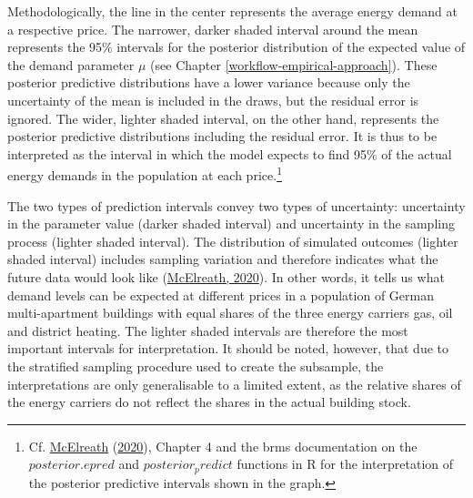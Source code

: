 \documentclass[12pt,twoside]{reedthesis}
\begin{document}
Methodologically, the line in the center represents the average energy demand at a respective price. The narrower, darker shaded interval around the mean represents the 95\% intervals for the posterior distribution of the expected value of the demand parameter \(\mu\) (see Chapter \ref{workflow-empirical-approach}). These posterior predictive distributions have a lower variance because only the uncertainty of the mean is included in the draws, but the residual error is ignored. The wider, lighter shaded interval, on the other hand, represents the posterior predictive distributions including the residual error. It is thus to be interpreted as the interval in which the model expects to find 95\% of the actual energy demands in the population at each price.\footnote{Cf. \protect\hyperlink{ref-mcelreath20}{McElreath} (\protect\hyperlink{ref-mcelreath20}{2020}), Chapter 4 and the brms documentation on the \(posterior.epred\) and \(posterior_predict\) functions in R for the interpretation of the posterior predictive intervals shown in the graph.}

The two types of prediction intervals convey two types of uncertainty: uncertainty in the parameter value (darker shaded interval) and uncertainty in the sampling process (lighter shaded interval). The distribution of simulated outcomes (lighter shaded interval) includes sampling variation and therefore indicates what the future data would look like (\protect\hyperlink{ref-mcelreath20}{McElreath, 2020}). In other words, it tells us what demand levels can be expected at different prices in a population of German multi-apartment buildings with equal shares of the three energy carriers gas, oil and district heating. The lighter shaded intervals are therefore the most important intervals for interpretation. It should be noted, however, that due to the stratified sampling procedure used to create the subsample, the interpretations are only generalisable to a limited extent, as the relative shares of the energy carriers do not reflect the shares in the actual building stock.
\end{document}
